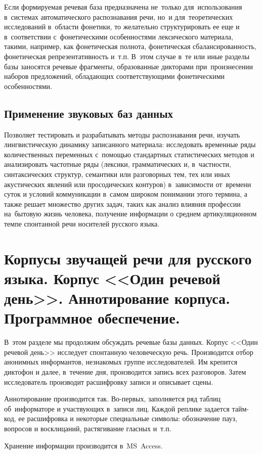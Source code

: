 \documentclass[12pt]{article}
\theoremstyle{definition}
\theoremstyle{remark}
\numberwithin{equation}{section}
\begin{document}
Если формируемая речевая база предназначена не~только для~использования 
в~системах автоматического распознавания речи, но~и для~теоретических 
исследований в~области фонетики, то желательно структурировать ее еще 
и в~соответствии с~фонетическими особенностями лексического материала, 
такими, например, как фонетическая полнота, фонетическая сбалансированность, 
фонетическая репрезентативность и~т.п. В~этом случае в~те или иные разделы 
базы заносятся речевые фрагменты, образованные дикторами при~произнесении 
наборов предложений, обладающих соответствующими фонетическими особенностями.

\subsection{Применение звуковых баз данных}
Позволяет тестировать и разрабатывать методы распознавания речи,
изучать лингвистическую динамику записанного материала: 
исследовать временные ряды количественных переменных с~помощью 
стандартных статистических методов и анализировать частотные ряды 
(лексики, грамматических и, в~частности, синтаксических структур, 
семантики или разговорных тем, тех или иных акустических явлений или 
просодических контуров) в~зависимости от~времени суток и условий 
коммуникации в~самом широком понимании этого термина, а также решает 
множество других задач, таких как анализ влияния профессии на~бытовую 
жизнь человека, получение информации о среднем артикуляционном темпе 
спонтанной речи носителей русского языка.

\section{Корпусы звучащей речи для русского языка. Корпус <<Один речевой день>>.
Аннотирование корпуса. Программное обеспечение.}
В~этом разделе мы продолжим обсуждать речевые базы данных. Корпус
<<Один речевой день>> исследует спонтанную человеческую речь.
Производится отбор анонимных информантов, незнакомых группе 
исследователей. Им крепится диктофон и далее, в~течение дня,
производится запись всех разговоров. Затем исследователь производит 
расшифровку записи и описывает сцены. 

Аннотирование производится так. Во-первых, заполняется ряд таблиц
об~информаторе и участвующих в~записи лиц. Каждой реплике
задается тайм-код, ее расшифровка и некоторые специальные 
символы: обозначение пауз, вопросов и восклицаний, растягивание
гласных и~т.п. 

Хранение информации производится в~MS~Access.
\end{document}
